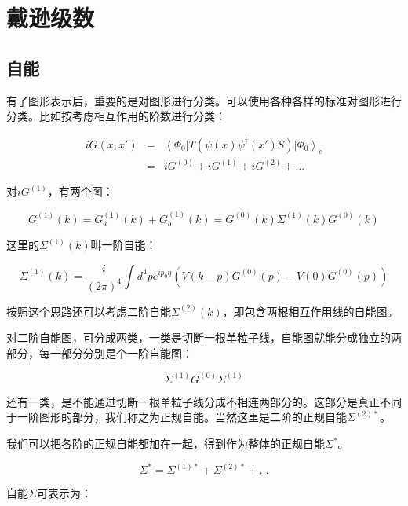 \section{戴逊级数}

\subsection{自能}

有了图形表示后，重要的是对图形进行分类。可以使用各种各样的标准对图形进行分类。比如按考虑相互作用的阶数进行分类：

\begin{eqnarray*}
i G (x,x') & = & \left\langle \Phi_0 \right| T \left( \psi(x) \psi^\dagger (x') S \right) \left| \Phi_0  \right\rangle_c \\
{} & = & i G^{(0)} + iG^{(1)} + iG^{(2)} + ... 
\end{eqnarray*}

对$i G^{(1)}$，有两个图：

\begin{equation*}
G^{(1)}(k) = G_a^{(1)} (k) + G_b^{(1)} (k) = G^{(0)}(k) \Sigma^{(1)}(k) G^{(0)}(k)
\end{equation*}

这里的$\Sigma^{(1)}(k)$叫一阶自能：

\begin{equation}
\Sigma^{(1)}(k) = \frac{i}{(2 \pi)^4 } \int d^4p e^{i p_0 \eta} \left( V(k-p) G^{(0)}(p)  - V(0) G^{(0)}(p)  \right) 
\end{equation}

按照这个思路还可以考虑二阶自能$\Sigma^{(2)}(k) $，即包含两根相互作用线的自能图。

对二阶自能图，可分成两类，一类是切断一根单粒子线，自能图就能分成独立的两部分，每一部分分别是个一阶自能图：

\begin{equation*}
\Sigma^{(1)} G^{(0)}  \Sigma^{(1)}
\end{equation*}

还有一类，是不能通过切断一根单粒子线分成不相连两部分的。这部分是真正不同于一阶图形的部分，我们称之为正规自能。当然这里是二阶的正规自能$\Sigma^{(2)*}$。

我们可以把各阶的正规自能都加在一起，得到作为整体的正规自能$\Sigma^*$。

\begin{equation}
\Sigma^* = \Sigma^{(1)*} + \Sigma^{(2)*} + ...
\end{equation}

自能$\Sigma$可表示为：

